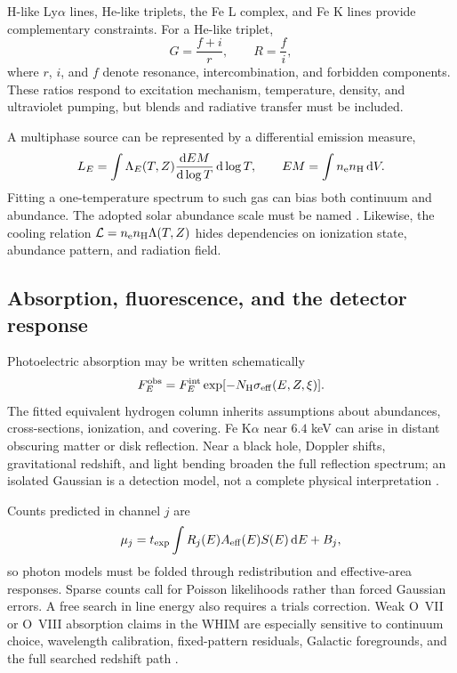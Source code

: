 H-like Ly$\alpha$ lines, He-like triplets, the Fe L complex, and Fe K lines
provide complementary constraints. For a He-like triplet,
\begin{equation}
 G=\frac{f+i}{r},\qquad R=\frac{f}{i},
\end{equation}
where $r$, $i$, and $f$ denote resonance, intercombination, and forbidden
components. These ratios respond to excitation mechanism, temperature,
density, and ultraviolet pumping, but blends and radiative transfer must be
included.

A multiphase source can be represented by a differential emission measure,
\begin{equation}
 L_E=\int \Lambda_E(T,Z)
 \frac{{\rm d}EM}{{\rm d}\log T}\,{\rm d}\log T,\qquad
 EM=\int n_{\rm e}n_{\rm H}\,{\rm d}V .
\end{equation}
Fitting a one-temperature spectrum to such gas can bias both continuum and
abundance. The adopted solar abundance scale must be named
\citep{Asplund2021}. Likewise, the cooling relation
$\mathcal{L}=n_{\rm e}n_{\rm H}\Lambda(T,Z)$ hides dependencies on ionization
state, abundance pattern, and radiation field.

\subsection{Absorption, fluorescence, and the detector response}

Photoelectric absorption may be written schematically
\begin{equation}
 F_E^{\rm obs}=F_E^{\rm int}
 \exp[-N_{\rm H}\sigma_{\rm eff}(E,Z,\xi)].
\end{equation}
The fitted equivalent hydrogen column inherits assumptions about abundances,
cross-sections, ionization, and covering. Fe K$\alpha$ near $6.4$ keV can
arise in distant obscuring matter or disk reflection. Near a black hole,
Doppler shifts, gravitational redshift, and light bending broaden the full
reflection spectrum; an isolated Gaussian is a detection model, not a
complete physical interpretation \citep{GeorgeFabian1991,Reynolds2014}.

Counts predicted in channel $j$ are
\begin{equation}
 \mu_j=t_{\rm exp}\int R_j(E)A_{\rm eff}(E)S(E)\,{\rm d}E+B_j ,
\end{equation}
so photon models must be folded through redistribution and effective-area
responses. Sparse counts call for Poisson likelihoods rather than forced
Gaussian errors. A free search in line energy also requires a trials
correction. Weak O~VII or O~VIII absorption claims in the WHIM are especially
sensitive to continuum choice, wavelength calibration, fixed-pattern
residuals, Galactic foregrounds, and the full searched redshift path
\citep{Bregman2007,Nicastro2018}.

